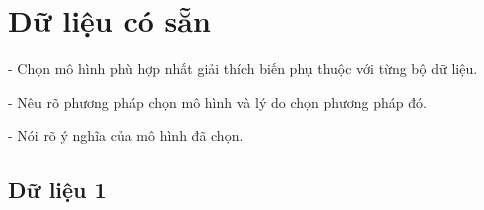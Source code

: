 \chapter{Dữ liệu có sẵn}
- Chọn mô hình phù hợp nhất giải thích biến phụ thuộc với từng bộ dữ liệu.

- Nêu rõ phương pháp chọn mô hình và lý do chọn phương pháp đó.

- Nói rõ ý nghĩa của mô hình đã chọn.
\section{Dữ liệu 1}